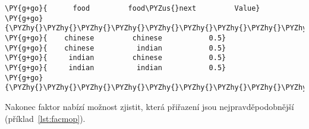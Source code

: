 \begin{example}
\begin{Verbatim}[commandchars=\\\{\}]
\PY{g+go}{      food         food\PYZus{}next         Value}
\PY{g+go}{\PYZhy{}\PYZhy{}\PYZhy{}\PYZhy{}\PYZhy{}\PYZhy{}\PYZhy{}\PYZhy{}\PYZhy{}\PYZhy{}\PYZhy{}\PYZhy{}\PYZhy{}\PYZhy{}\PYZhy{}\PYZhy{}\PYZhy{}\PYZhy{}\PYZhy{}\PYZhy{}\PYZhy{}\PYZhy{}\PYZhy{}\PYZhy{}\PYZhy{}\PYZhy{}\PYZhy{}\PYZhy{}\PYZhy{}\PYZhy{}\PYZhy{}\PYZhy{}\PYZhy{}\PYZhy{}\PYZhy{}\PYZhy{}\PYZhy{}\PYZhy{}\PYZhy{}\PYZhy{}\PYZhy{}\PYZhy{}\PYZhy{}\PYZhy{}\PYZhy{}\PYZhy{}\PYZhy{}\PYZhy{}\PYZhy{}\PYZhy{}}
\PY{g+go}{    chinese         chinese           0.5}
\PY{g+go}{    chinese          indian           0.5}
\PY{g+go}{     indian         chinese           0.5}
\PY{g+go}{     indian          indian           0.5}
\PY{g+go}{\PYZhy{}\PYZhy{}\PYZhy{}\PYZhy{}\PYZhy{}\PYZhy{}\PYZhy{}\PYZhy{}\PYZhy{}\PYZhy{}\PYZhy{}\PYZhy{}\PYZhy{}\PYZhy{}\PYZhy{}\PYZhy{}\PYZhy{}\PYZhy{}\PYZhy{}\PYZhy{}\PYZhy{}\PYZhy{}\PYZhy{}\PYZhy{}\PYZhy{}\PYZhy{}\PYZhy{}\PYZhy{}\PYZhy{}\PYZhy{}\PYZhy{}\PYZhy{}\PYZhy{}\PYZhy{}\PYZhy{}\PYZhy{}\PYZhy{}\PYZhy{}\PYZhy{}\PYZhy{}\PYZhy{}\PYZhy{}\PYZhy{}\PYZhy{}\PYZhy{}\PYZhy{}\PYZhy{}\PYZhy{}\PYZhy{}\PYZhy{}}
\end{Verbatim}
\caption{Normalizace faktoru}
\label{lst:facnor}
\end{example}


Nakonec faktor nabízí možnost zjistit, která přiřazení jsou nejpravděpodobnější (příklad~\ref{lst:facmop}).

